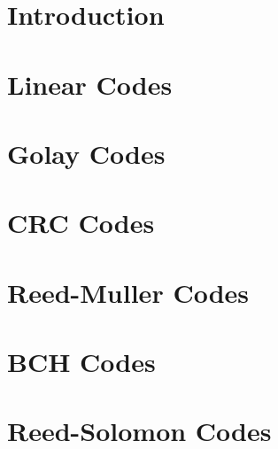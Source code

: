 \label{sec:coding}



\section{Introduction}



\clearpage

\section{Linear Codes}
\label{sec:linear:codes}






\clearpage

\section{Golay Codes}
\label{sec:Golay}






\clearpage

\section{CRC Codes}
\label{sec:CRC}






\clearpage

\section{Reed-Muller Codes}
\label{sec:Reed:Muller}






\clearpage

\section{BCH Codes}
\label{sec:BCH}






\clearpage

\section{Reed-Solomon Codes}
\label{sec:Reed:Solomon}



